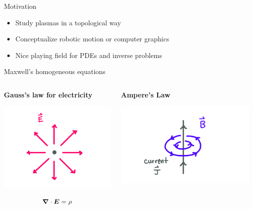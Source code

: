 \documentclass[aspectratio=169]{beamer}
\begin{document}
\begin{frame}{Motivation}
\vfill
\begin{itemize}
\item Study plasmas in a topological way
\item Conceptualize robotic motion or computer graphics
\item Nice playing field for PDEs and inverse problems
\end{itemize}
\vfill
\end{frame}

\begin{frame}{Maxwell's homogeneous equations}
    \begin{columns}[c] 

    
    \begin{center} \textbf{Gauss's law for electricity}
    
    \includegraphics[scale=.55]{figures/gauss_i.png}
    \vspace*{-10mm}
    
    $$ \boldsymbol{\nabla}\cdot \boldsymbol{E} = \rho $$
    
    
    \end{center}
    
    
    \begin{center}
    
    \textbf{Ampere's Law}
    
    \includegraphics[scale=.6]{figures/ampere.png}
    

\end{center}
\end{columns}
\end{frame}
\end{document}
